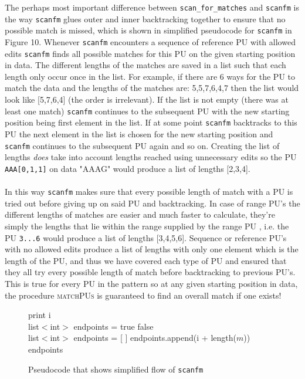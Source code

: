 \documentclass[12pt]{article}
\newcommand{\scm}{\texttt{scan\_for\_matches} }
\newcommand{\sfm}{\texttt{scanfm} }
\newcommand{\pu}{PU }
\newcommand{\pus}{PU's }
\newcommand{\pusp}{PU's. }
\begin{document}
The perhaps most important difference between \scm and \sfm is the way \sfm glues outer and inner backtracking together
to ensure that no possible match is missed, which is shown in simplified pseudocode for \sfm in Figure 10.
Whenever \sfm encounters a sequence of reference \pu with allowed edits
\sfm finds all possible matches for this \pu on the given starting position in data. The different
lengths of the matches are saved in a list such that each length only occur once in the list. For example, if 
there are 6 ways for the \pu to match the data and the lengths of the matches are: 5,5,7,6,4,7 then the list would
look like [5,7,6,4] (the order is irrelevant). If the list is not empty (there was at least one match)
\sfm continues to the subsequent \pu with the new starting position being first element in the list. If at some
point \sfm backtracks to this \pu the next element in the list is chosen for the new starting position and \sfm
continues to the subsequent \pu again and so on. Creating the list of lengths \emph{does} take into account lengths reached using
unnecessary edits so the \pu \texttt{AAA[0,1,1]} on data "AAAG" would produce a list of lengths [2,3,4]. \\ \\
In this way \sfm makes sure that every possible length of match with a \pu is tried out before giving up on said \pu
and backtracking. In case of range \pus the different lengths of matches are easier and much faster to calculate, 
they're simply the lengths that lie within the range supplied by the range \pu, i.e. the \pu \texttt{3...6}
would produce a list of lengths [3,4,5,6]. Sequence or reference \pus with no allowed edits produce a list
of lengths with only one element which is the length of the PU, and thus we have covered each type of \pu and ensured
that they all try every possible length of match before backtracking to previous \pusp This is true for every
\pu in the pattern so at any given starting position in data, the procedure \textsc{\small matchPUs} is
guaranteed to find an overall match if one exists!
\begin{figure}[H]
\begin{center}
\begin{algorithmic}[1]
        \State print i
      \EndIf
    \EndFor
  \EndProcedure \\
    \State list$<$int$>$ endpoints = 
        \State \Return true
      \EndIf
    \EndFor
    \State \Return false
  \EndProcedure \\
    \State list$<$int$>$ endpoints = [ ]
        \State endpoints.append(i + length($m$))
      \EndIf
    \EndFor
    \State \Return endpoints
  \EndProcedure
\end{algorithmic}
\end{center}
\caption{Pseudocode that shows simplified flow of \sfm}
\end{figure}
\end{document}
